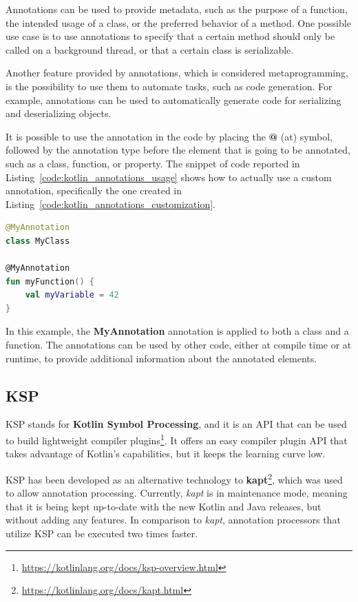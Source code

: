 Annotations can be used to provide metadata, such as the purpose of a function, the intended usage of a class, or the preferred behavior of a method. One possible use case is to use annotations to specify that a certain method should only be called on a background thread, or that a certain class is serializable.

Another feature provided by annotations, which is considered metaprogramming, is the possibility to use them to automate tasks, such as code generation. For example, annotations can be used to automatically generate code for serializing and deserializing objects.

It is possible to use the annotation in the code by placing the \textbf{@} (at) symbol, followed by the annotation type before the element that is going to be annotated, such as a class, function, or property.\newline
The snippet of code reported in Listing~\ref{code:kotlin_annotations_usage} shows how to actually use a custom annotation, specifically the one created in Listing~\ref{code:kotlin_annotations_customization}.
\begin{lstlisting}[caption={Example of usage of a custom annotation in Kotlin}, language=Kotlin, captionpos=b, label={code:kotlin_annotations_usage}]
@MyAnnotation
class MyClass

@MyAnnotation
fun myFunction() {
    val myVariable = 42
}
\end{lstlisting}
In this example, the \textbf{MyAnnotation} annotation is applied to both a class and a function. The annotations can be used by other code, either at compile time or at runtime, to provide additional information about the annotated elements.

\subsection{KSP}\label{section:ksp}
KSP stands for \textbf{Kotlin Symbol Processing}, and it is an API that can be used to build lightweight compiler plugins\footnote{\url{https://kotlinlang.org/docs/ksp-overview.html}\label{ksp_footnote}}. It offers an easy compiler plugin API that takes advantage of Kotlin's capabilities, but it keeps the learning curve low.

KSP has been developed as an alternative technology to \textbf{kapt}\footnote{\url{https://kotlinlang.org/docs/kapt.html}}, which was used to allow annotation processing. Currently, \textit{kapt} is in maintenance mode, meaning that it is being kept up-to-date with the new Kotlin and Java releases, but without adding any features.\newline
In comparison to \textit{kapt}, annotation processors that utilize KSP can be executed two times faster.


